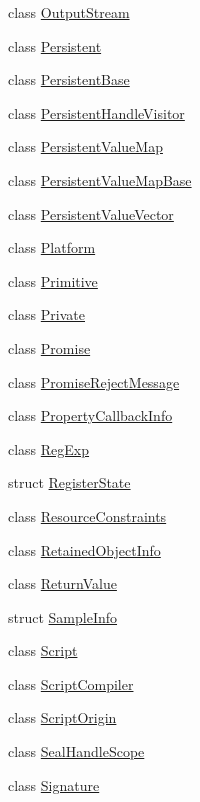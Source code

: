 \begin{DoxyCompactItemize}
class \hyperlink{classv8_1_1_output_stream}{Output\+Stream}
\item 
class \hyperlink{classv8_1_1_persistent}{Persistent}
\item 
class \hyperlink{classv8_1_1_persistent_base}{Persistent\+Base}
\item 
class \hyperlink{classv8_1_1_persistent_handle_visitor}{Persistent\+Handle\+Visitor}
\item 
class \hyperlink{classv8_1_1_persistent_value_map}{Persistent\+Value\+Map}
\item 
class \hyperlink{classv8_1_1_persistent_value_map_base}{Persistent\+Value\+Map\+Base}
\item 
class \hyperlink{classv8_1_1_persistent_value_vector}{Persistent\+Value\+Vector}
\item 
class \hyperlink{classv8_1_1_platform}{Platform}
\item 
class \hyperlink{classv8_1_1_primitive}{Primitive}
\item 
class \hyperlink{classv8_1_1_private}{Private}
\item 
class \hyperlink{classv8_1_1_promise}{Promise}
\item 
class \hyperlink{classv8_1_1_promise_reject_message}{Promise\+Reject\+Message}
\item 
class \hyperlink{classv8_1_1_property_callback_info}{Property\+Callback\+Info}
\item 
class \hyperlink{classv8_1_1_reg_exp}{Reg\+Exp}
\item 
struct \hyperlink{structv8_1_1_register_state}{Register\+State}
\item 
class \hyperlink{classv8_1_1_resource_constraints}{Resource\+Constraints}
\item 
class \hyperlink{classv8_1_1_retained_object_info}{Retained\+Object\+Info}
\item 
class \hyperlink{classv8_1_1_return_value}{Return\+Value}
\item 
struct \hyperlink{structv8_1_1_sample_info}{Sample\+Info}
\item 
class \hyperlink{classv8_1_1_script}{Script}
\item 
class \hyperlink{classv8_1_1_script_compiler}{Script\+Compiler}
\item 
class \hyperlink{classv8_1_1_script_origin}{Script\+Origin}
\item 
class \hyperlink{classv8_1_1_seal_handle_scope}{Seal\+Handle\+Scope}
\item 
class \hyperlink{classv8_1_1_signature}{Signature}

\end{DoxyCompactItemize}
